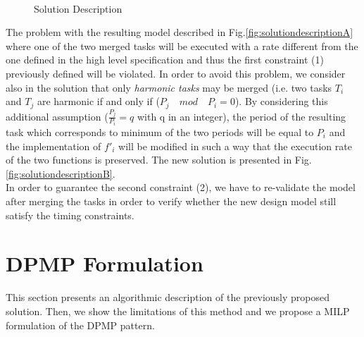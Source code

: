 \documentclass[runningheads,a4paper]{llncs}
\begin{document}
\begin{figure}[h]\label{fig:solutiondescription}
\centering
\mbox
{
}
\caption{Solution Description}
\end{figure}


The problem with the resulting model described in Fig.\ref{fig:solutiondescriptionA} where one of the two merged tasks will be executed with a rate different from the one defined in the high level specification and thus the first constraint (1) previously defined will be violated. In order to avoid this problem, we consider also in the solution that only \emph{harmonic tasks} may be merged (i.e. two tasks $T_i$ and $T_j$ are harmonic if and only if ($P_j\quad mod \quad P_i = 0$). 
By considering this additional assumption ($\frac{P_j}{P_i} = q $ with q in an integer), the period of the resulting task which corresponds to minimum of the two periods will be equal to $P_i$ and the implementation of $f'_i$ will be modified in such a way that the execution rate of the two functions is preserved. The new solution is presented in Fig. \ref{fig:solutiondescriptionB}.
\\In order to guarantee the second constraint (2), we have to re-validate the model after merging the tasks in order to verify whether the new design model still satisfy the timing constraints.

\section{DPMP Formulation}
This section presents an algorithmic description of the previously proposed solution. Then, we show the limitations of this method and we propose a MILP formulation of the DPMP pattern.  
\end{document}
